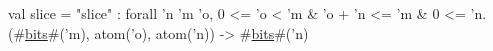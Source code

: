 val slice = "slice" : forall 'n 'm 'o, 0 <= 'o < 'm & 'o + 'n <= 'm & 0 <= 'n.
  (#\hyperref[zbits]{bits}#('m), atom('o), atom('n)) -> #\hyperref[zbits]{bits}#('n)
